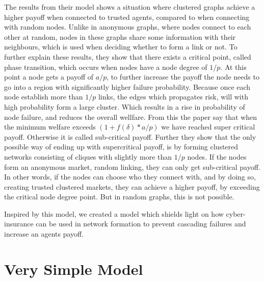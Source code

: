 The results from their model shows a situation where clustered graphs achieve a higher payoff when connected to trusted agents, compared to when connecting with random nodes. Unlike in anonymous graphs, where nodes connect to each other at random, nodes in these graphs share some information with their neighbours, which is used when deciding whether to form a link or not. 
To further explain these results, they show that there exists a critical point, called phase transition, which occurs when nodes have a node degree of $1/p$. 
At this point a node gets a payoff of $a/p$, to further increase the payoff the node needs to go into a region with significantly higher failure probability. 
Because once each node establish more than $1/p$ links, the edges which propagates risk, will with high probability form a large cluster. Which results in a rise in probability of node failure, and reduces the overall wellfare.
From this the paper say that when the minimum welfare exceeds 
$(1+f(\delta)*a/p)$
we have reached super critical payoff. Otherwise it is called sub-critical payoff. 
Further they show that the only possible way of ending up with supercritical payoff, is by forming clustered networks consisting of cliques with slightly more than $1/p$ nodes. 
If the nodes form an anonymous market, random linking, they can only get sub-critical payoff. 
In other words, if the nodes can choose who they connect with, and by doing so, creating trusted clustered markets, they can achieve a higher payoff, by exceeding the critical node degree point. But in random graphs, this is not possible. 


Inspired by this model, we created a model which shields light on how cyber-insurance can be used in network formation to prevent cascading failures and increase an agents payoff.  



\section{Very Simple Model \label{section:verysimplemodel}}

